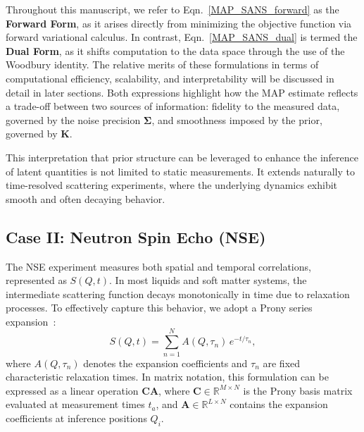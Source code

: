 \documentclass[12pt]{article}
\begin{document}
Throughout this manuscript, we refer to Eqn.~\eqref{MAP_SANS_forward} as the \textbf{Forward Form}, as it arises directly from minimizing the objective function via forward variational calculus. In contrast, Eqn.~\eqref{MAP_SANS_dual} is termed the \textbf{Dual Form}, as it shifts computation to the data space through the use of the Woodbury identity. The relative merits of these formulations in terms of computational efficiency, scalability, and interpretability will be discussed in detail in later sections.
Both expressions highlight how the MAP estimate reflects a trade-off between two sources of information: fidelity to the measured data, governed by the noise precision \( \boldsymbol{\Sigma} \), and smoothness imposed by the prior, governed by \( \mathbf{K} \).

This interpretation that prior structure can be leveraged to enhance the inference of latent quantities is not limited to static measurements. It extends naturally to time-resolved scattering experiments, where the underlying dynamics exhibit smooth and often decaying behavior.

\subsection{Case II: Neutron Spin Echo (NSE)}

The NSE experiment measures both spatial and temporal correlations, represented as \( S(Q,t) \). In most liquids and soft matter systems, the intermediate scattering function decays monotonically in time due to relaxation processes. To effectively capture this behavior, we adopt a Prony series expansion~\cite{Tschoegl, Nievergelt2000, Pereyra2010, mauro2018prony}:
\begin{equation}
    S(Q, t) = \sum_{n=1}^N A(Q, \tau_n) \, e^{-t / \tau_n},
    \label{eq:S_Prony}
\end{equation}
where \( A(Q, \tau_n) \) denotes the expansion coefficients and \( \tau_n \) are fixed characteristic relaxation times. In matrix notation, this formulation can be expressed as a linear operation \( \mathbf{C} \mathbf{A} \), where \( \mathbf{C} \in \mathbb{R}^{M \times N} \) is the Prony basis matrix evaluated at measurement times \( t_a \), and \( \mathbf{A} \in \mathbb{R}^{L \times N} \) contains the expansion coefficients at inference positions \( Q_i \).
\end{document}

